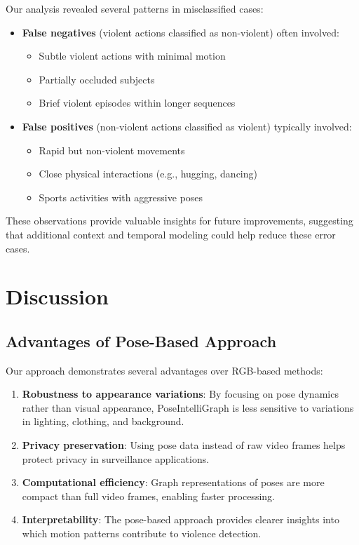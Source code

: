 \documentclass[conference]{IEEEtran}
\begin{document}
Our analysis revealed several patterns in misclassified cases:

\begin{itemize}
    \item \textbf{False negatives} (violent actions classified as non-violent) often involved:
          \begin{itemize}
              \item Subtle violent actions with minimal motion
              \item Partially occluded subjects
              \item Brief violent episodes within longer sequences
          \end{itemize}

    \item \textbf{False positives} (non-violent actions classified as violent) typically involved:
          \begin{itemize}
              \item Rapid but non-violent movements
              \item Close physical interactions (e.g., hugging, dancing)
              \item Sports activities with aggressive poses
          \end{itemize}
\end{itemize}

These observations provide valuable insights for future improvements,
suggesting that additional context and temporal modeling could help reduce
these error cases.

\section{Discussion}

\subsection{Advantages of Pose-Based Approach}
Our approach demonstrates several advantages over RGB-based methods:

\begin{enumerate}
    \item \textbf{Robustness to appearance variations}: By focusing on pose dynamics rather than visual appearance, PoseIntelliGraph is less sensitive to variations in lighting, clothing, and background.
    \item \textbf{Privacy preservation}: Using pose data instead of raw video frames helps protect privacy in surveillance applications.
    \item \textbf{Computational efficiency}: Graph representations of poses are more compact than full video frames, enabling faster processing.
    \item \textbf{Interpretability}: The pose-based approach provides clearer insights into which motion patterns contribute to violence detection.
\end{enumerate}
\end{document}
